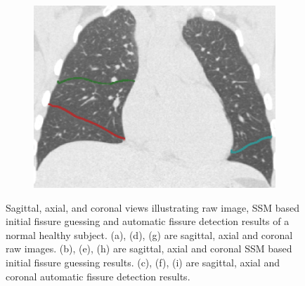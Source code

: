 {\begin{figure}[htbp]
\begin{subfigure}{.32\linewidth}
  \includegraphics[width=\linewidth,trim={{.0\wd0} {.0\wd0} {.0\wd0} {.0\wd0}},clip]{Segmentation/Image/H1335_FRC_PCAFissureDetection_Coronal.png}
  \caption{}
  \label{fig:HLASegmentationResults-i} 
\end{subfigure}
\caption{Sagittal, axial, and coronal views illustrating raw image, SSM based initial fissure guessing and automatic fissure detection results of a normal healthy subject. (a), (d), (g) are sagittal, axial and coronal raw images. (b), (e), (h) are sagittal, axial and coronal SSM based initial fissure guessing results. (c), (f), (i) are sagittal, axial and coronal automatic fissure detection results.}
\label{fig:HLASegmentationResults}
\end{figure}

}
